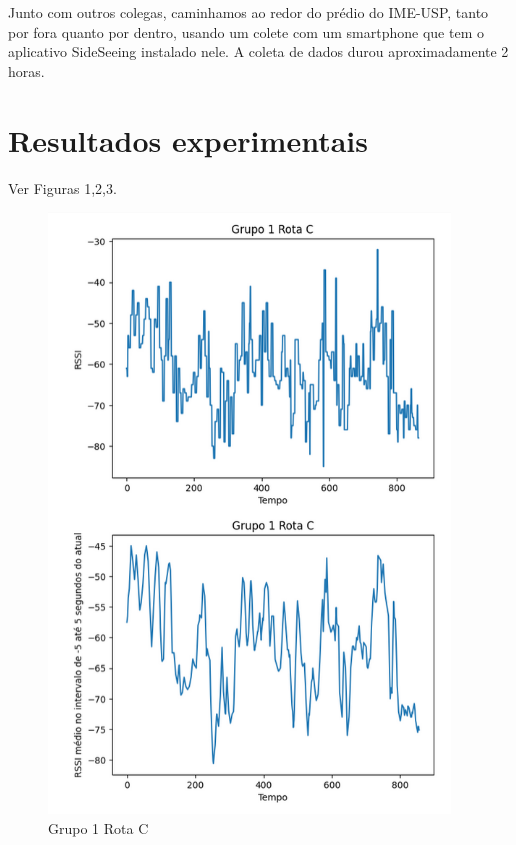 \documentclass{article}
\begin{document}
Junto com outros colegas, caminhamos ao redor do prédio do IME-USP, tanto por fora quanto por
dentro, usando um colete com um smartphone que tem o aplicativo SideSeeing instalado nele. A coleta
de dados durou aproximadamente 2 horas.  

\section{Resultados experimentais}
Ver Figuras 1,2,3.  

\begin{figure}
  \begin{center}
    \includegraphics[width=0.95\textwidth]{figures/grupo_1-rota_c}
  \end{center}
  \caption{Grupo 1 Rota C}\label{fig:grupo_1-rota_c}
\end{figure}
\end{document}
